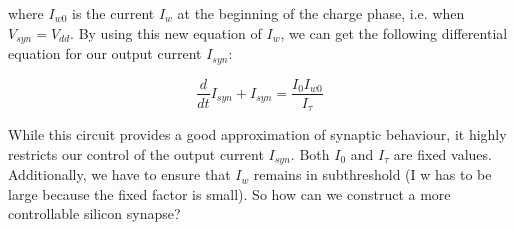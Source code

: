 where $I_{w0}$ is the current $I_w$ at the beginning of the charge phase, i.e. when $V_{syn} = V_{dd}$. By using this new equation of $I_w$, we can get the following differential equation for our output current $I_{syn}$:

\begin{equation}
    \frac{d}{dt} I_{syn} + I_{syn} = \frac{I_0 I_{w0}}{I_{\tau}}
\end{equation}

While this circuit provides a good approximation of synaptic behaviour, it highly restricts our control of the output current $I_{syn}$. Both $I_0$ and $I_{\tau}$ are fixed values. Additionally, we have to ensure that $I_{w}$ remains in subthreshold (I w has to be large because the fixed factor is small). So how can we construct a more controllable silicon synapse?